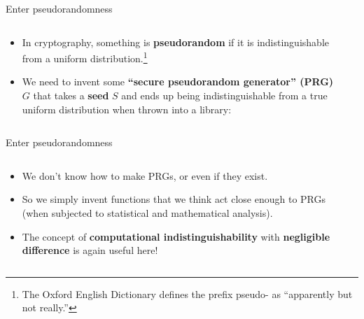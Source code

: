 \documentclass[aspectratio=169, lualatex, handout]{beamer}
\begin{document}
\begin{frame}{Enter pseudorandomness}
	\begin{columns}[c]
		\begin{column}{0.5\textwidth}
			\begin{itemize}
				\item In cryptography, something is \textbf{pseudorandom} if it is indistinguishable from a uniform distribution.\footnote{The Oxford English Dictionary defines the prefix pseudo- as ``apparently but not really.''}
				\item We need to invent some \textbf{``secure pseudorandom generator'' (PRG)} $G$ that takes a \textbf{seed} $S$ and ends up being indistinguishable from a true uniform distribution when thrown into a library:
			\end{itemize}
		\end{column}
		\begin{column}{0.5\textwidth}
		\end{column}
	\end{columns}
\end{frame}

\begin{frame}{Enter pseudorandomness}
	\begin{columns}[c]
		\begin{column}{0.5\textwidth}
			\begin{itemize}
				\item We don't know how to make PRGs, or even if they exist.
				\item So we simply invent functions that we think act close enough to PRGs (when subjected to statistical and mathematical analysis).
				\item The concept of \textbf{computational indistinguishability} with \textbf{negligible difference} is again useful here!
			\end{itemize}
		\end{column}
		\begin{column}{0.5\textwidth}
		\end{column}
	\end{columns}
\end{frame}
\end{document}

